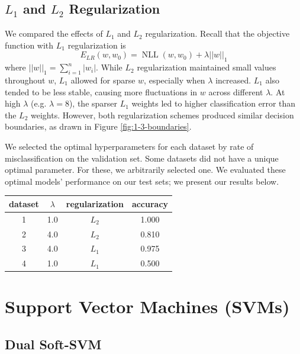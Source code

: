 \documentclass{article}
\DeclareMathOperator{\NLL}{NLL}
\begin{document}
\begin{multicols}{2}
\subsection{$L_1$ and $L_2$ Regularization}
We compared the effects of $L_1$ and $L_2$ regularization.
Recall that the objective function with $L_1$ regularization is
\begin{equation}
    E_{LR}(w, w_0) = \NLL(w, w_0) + \lambda ||w||_1
\end{equation}
where $||w||_1 = \sum_{i=1}^n{|w_i|}$. 
While $L_2$ regularization maintained small values throughout $w$, $L_1$ allowed for sparse $w$, especially when $\lambda$ increased. $L_1$ also tended to be less stable, causing more fluctuations in $w$ across different $\lambda$. At high $\lambda$ (e.g. $\lambda = 8$), the sparser $L_1$ weights led to higher classification error than the $L_2$ weights. However, both regularization schemes produced similar decision boundaries, as drawn in Figure \ref{fig:1-3-boundaries}.

We selected the optimal hyperparameters for each dataset
by rate of misclassification on the validation set.
Some datasets did not have a unique optimal parameter.
For these, we arbitrarily selected one.
We evaluated these optimal models' performance on our test sets;
we present our results below.
\begin{center}
\begin{tabular}{|c||c|c|c|}
\hline
dataset & $\lambda$	& regularization		 & accuracy \\\hline
        1	& 1.0 & $L_2$ & 1.000\\
        2	& 4.0 & $L_2$ & 0.810 \\
        3	& 4.0 & $L_1$ & 0.975 \\
        4	& 1.0 & $L_1$ & 0.500 \\\hline
\end{tabular}
\end{center}




\section{Support Vector Machines (SVMs)}
\label{sec:svm}

\subsection{Dual Soft-SVM}


\end{multicols}
\end{document}
